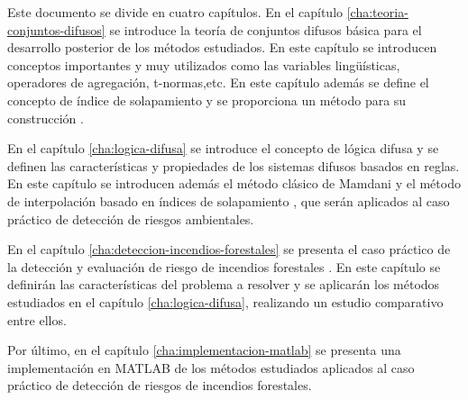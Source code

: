 Este documento se divide en cuatro capítulos. En el capítulo \ref{cha:teoria-conjuntos-difusos} se introduce la teoría de conjuntos difusos básica para el desarrollo posterior de los métodos estudiados. En este capítulo se introducen conceptos importantes y muy utilizados como las variables lingüísticas, operadores de agregación, t-normas,etc. En este capítulo además se define el concepto de índice de solapamiento y se proporciona un método para su construcción \cite{bustince2013overlap}.

En el capítulo \ref{cha:logica-difusa} se introduce el concepto de lógica difusa y se definen las características y propiedades de los sistemas difusos basados en reglas. En este capítulo se introducen además el método clásico de Mamdani \cite{Mamdani1975} y el método de interpolación basado en índices de solapamiento \cite{bustince2013overlap}, que serán aplicados al caso práctico de detección de riesgos ambientales.

En el capítulo \ref{cha:deteccion-incendios-forestales} se presenta el caso práctico de la detección y evaluación de riesgo de incendios forestales \cite{bolourchi2013}. En este capítulo se definirán las características del problema a resolver y se aplicarán los métodos estudiados en el capítulo \ref{cha:logica-difusa}, realizando un estudio comparativo entre ellos.

Por último, en el capítulo \ref{cha:implementacion-matlab} se presenta una implementación en MATLAB de los métodos estudiados aplicados al caso práctico de detección de riesgos de incendios forestales.